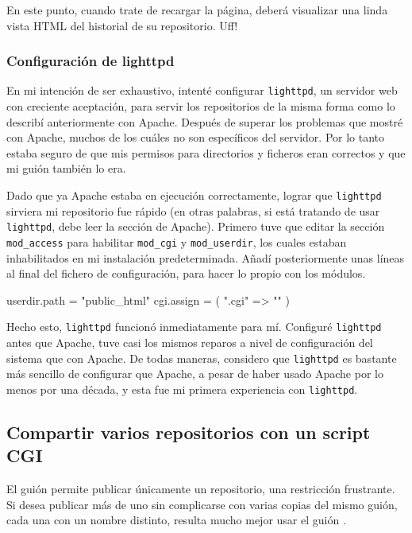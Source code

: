 En este punto, cuando trate de recargar la página, deberá visualizar
una linda vista HTML del historial de su repositorio. Uff!

\subsubsection{Configuración de lighttpd}

En mi intención de ser exhaustivo, intenté configurar
\texttt{lighttpd}, un servidor web con creciente aceptación, para
servir los repositorios de la misma forma como lo describí
anteriormente con Apache. Después de superar los problemas que mostré
con Apache, muchos de los cuáles no son específicos del servidor.  Por
lo tanto estaba seguro de que mis permisos para directorios y ficheros
eran correctos y que mi guión  también lo era.

Dado que ya Apache estaba en ejecución correctamente, lograr que
\texttt{lighttpd} sirviera mi repositorio fue rápido (en otras
palabras, si está tratando de usar \texttt{lighttpd}, debe leer la
sección de Apache).  Primero tuve que editar la sección
\texttt{mod\_access} para habilitar \texttt{mod\_cgi} y
\texttt{mod\_userdir}, los cuales estaban inhabilitados en mi
instalación predeterminada.  Añadí posteriormente unas líneas al final
del fichero de configuración, para hacer lo propio con los módulos.
\begin{codesample2}
  userdir.path = "public_html"
  cgi.assign = ( ".cgi" => "" )
\end{codesample2}
Hecho esto, \texttt{lighttpd} funcionó inmediatamente para
mí. Configuré \texttt{lighttpd} antes que Apache, tuve casi los mismos
reparos a nivel de configuración del sistema que con Apache.  De todas
maneras, considero que \texttt{lighttpd} es bastante más sencillo de
configurar que Apache, a pesar de haber usado Apache por lo menos por
una década, y esta fue mi primera experiencia con \texttt{lighttpd}.

\subsection{Compartir varios repositorios con un script CGI}

El guión  permite publicar únicamente un
repositorio, una restricción frustrante.  Si desea publicar más de uno
sin complicarse con varias copias del mismo guión, cada una con un
nombre distinto, resulta mucho mejor usar el guión
.

